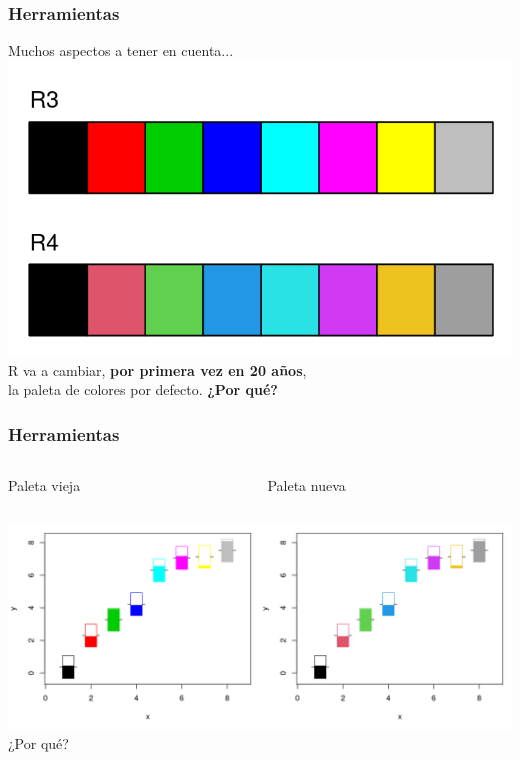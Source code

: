 \documentclass{beamer}
\begin{document}

\begin{frame}\frametitle{Herramientas}
	
	\centering
	Muchos aspectos a tener en cuenta...
	\includegraphics[width=.8\textwidth]{images/palette}\\
	R va a cambiar, \textbf{por primera vez en 20 años},\\
	la paleta de colores por defecto. \textbf{¿Por qué?}
	
\end{frame}


\begin{frame}\frametitle{Herramientas}
	
	\begin{columns}
		\begin{column}{0.5\textwidth}
			\centering \hspace{15pt} Paleta vieja
		\end{column}
		\begin{column}{0.5\textwidth}
			\centering \hspace{15pt} Paleta nueva
		\end{column}
	\end{columns}
	
	\centering
	\includegraphics[width=1\textwidth]{images/palette2}\\
	\large
	¿Por qué?
	
\end{frame}
\end{document}
